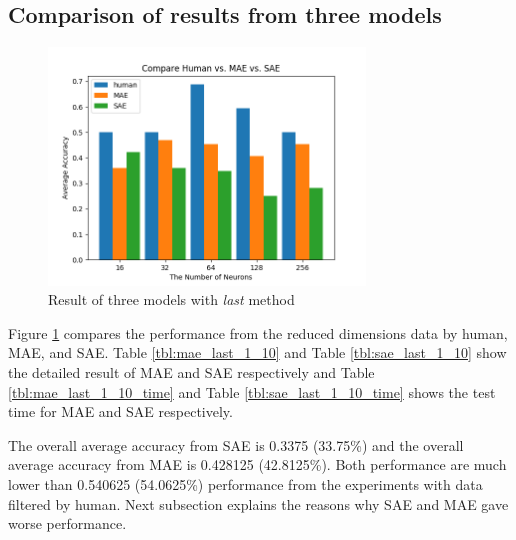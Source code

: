 \documentclass[draft,dvipsnames]{drexel-thesis}
\begin{document}
\begin{thesis}
\subsection{Comparison of results from three models}
\begin{figure}[t!]
    \centering
    \includegraphics[width=0.75\textwidth]{pictures/result_pictures/compare_result_last_1_10.png}
    \caption{Result of three models with {\em last} method}
    \label{fig:compare_result_last_1_10}
\end{figure}

Figure \ref{fig:compare_result_last_1_10} compares the performance from the reduced dimensions data by human, MAE, and SAE. Table \ref{tbl:mae_last_1_10} and Table \ref{tbl:sae_last_1_10} show the detailed result of MAE and SAE respectively and Table \ref{tbl:mae_last_1_10_time} and Table \ref{tbl:sae_last_1_10_time} shows the test time for MAE and SAE respectively.

The overall average accuracy from SAE is 0.3375 (33.75\%) and the overall average accuracy from MAE is 0.428125 (42.8125\%). Both performance are much lower than 0.540625 (54.0625\%) performance from the experiments with data filtered by human. Next subsection explains the reasons why SAE and MAE gave worse performance.


\end{thesis}
\end{document}
